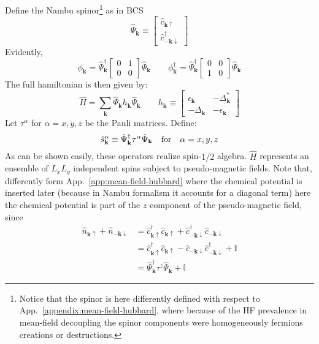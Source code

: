 Define the Nambu spinor\footnote{
	Notice that the spinor is here differently defined with respect to App.~\ref{appendix:mean-field-hubbard}, where because of the HF prevalence in mean-field decoupling the spinor components were homogeneously fermions creations or destructions.
} as in BCS
\[
\hat \Psi_\mathbf{k} \equiv \begin{bmatrix}
	\hat c_{\mathbf{k}\uparrow} \\
	\hat c_{-\mathbf{k}\downarrow}^\dagger
\end{bmatrix}
\]
Evidently,
\begin{equation}\label{eq:extended-hubbard-phi-psi-expressions}
	\phi_\mathbf{k} = \hat \Psi_\mathbf{k}^\dagger \begin{bmatrix}
		0 & 1 \\ 0 & 0
	\end{bmatrix} \hat \Psi_\mathbf{k}
	\qquad
	\phi_\mathbf{k}^\dagger = \hat \Psi_\mathbf{k}^\dagger \begin{bmatrix}
		0 & 0 \\ 1 & 0
	\end{bmatrix} \hat \Psi_\mathbf{k}
\end{equation}
The full hamiltonian is then given by:
\begin{equation}\label{eq:extended-hubbard-hamiltonian-nambu-bogoliubov}
	\hat H = \sum_\mathbf{k} \hat \Psi_\mathbf{k} h_\mathbf{k} \hat \Psi_\mathbf{k}
	\qquad
	h_\mathbf{k} \equiv \begin{bmatrix}
		\epsilon_\mathbf{k} & - \Delta_\mathbf{k}^* \\
		- \Delta_\mathbf{k} & - \epsilon_\mathbf{k}
	\end{bmatrix}
\end{equation}
Let $\tau^\alpha$ for $\alpha = x,y,z$ be the Pauli matrices. Define:
\[
\hat s_\mathbf{k}^\alpha \equiv \hat \Psi_\mathbf{k}^\dagger \tau^\alpha \hat \Psi_\mathbf{k}
\qq{for}
\alpha = x,y,z
\]
As can be shown easily, these operators realize spin-$1/2$ algebra. $\hat H$ represents an ensemble of $L_x L_y$ independent spins subject to pseudo-magnetic fields. Note that, differently form App.~\ref{app:mean-field-hubbard} where the chemical potential is inserted later (because in Nambu formalism it accounts for a diagonal term) here the chemical potential is part of the $z$ component of the pseudo-magnetic field, since
\begin{align}
	\hat n_{\mathbf{k}\uparrow} + \hat n_{-\mathbf{k}\downarrow} &= \hat c_{\mathbf{k}\uparrow}^\dagger \hat c_{\mathbf{k}\uparrow} + \hat c_{-\mathbf{k}\downarrow}^\dagger \hat c_{-\mathbf{k}\downarrow} \nonumber \\
	&= \hat c_{\mathbf{k}\uparrow}^\dagger \hat c_{\mathbf{k}\uparrow} - \hat c_{-\mathbf{k}\downarrow} \hat c_{-\mathbf{k}\downarrow}^\dagger + \mathbb{I} \nonumber \\
	&=  \hat \Psi_\mathbf{k}^\dagger \tau^z \hat \Psi_\mathbf{k} + \mathbb{I} \label{eq:number-operator-z-spin-relation}
\end{align}
